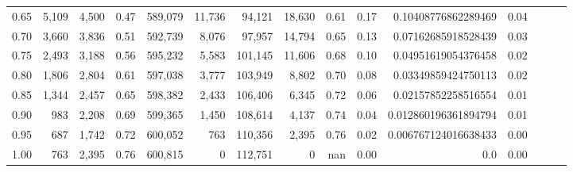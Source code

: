 \begin{tabular}{rrrrrrrrrrrrrrr}
0.65 &    5,109 &  4,500 &  0.47 &  589,079 &   11,736 &   94,121 &   18,630 &  0.61 &  0.17 &   0.10408776862289469 &      0.04 \\
0.70 &    3,660 &  3,836 &  0.51 &  592,739 &    8,076 &   97,957 &   14,794 &  0.65 &  0.13 &   0.07162685918528439 &      0.03 \\
0.75 &    2,493 &  3,188 &  0.56 &  595,232 &    5,583 &  101,145 &   11,606 &  0.68 &  0.10 &   0.04951619054376458 &      0.02 \\
0.80 &    1,806 &  2,804 &  0.61 &  597,038 &    3,777 &  103,949 &    8,802 &  0.70 &  0.08 &   0.03349859424750113 &      0.02 \\
0.85 &    1,344 &  2,457 &  0.65 &  598,382 &    2,433 &  106,406 &    6,345 &  0.72 &  0.06 &   0.02157852258516554 &      0.01 \\
0.90 &      983 &  2,208 &  0.69 &  599,365 &    1,450 &  108,614 &    4,137 &  0.74 &  0.04 &  0.012860196361894794 &      0.01 \\
0.95 &      687 &  1,742 &  0.72 &  600,052 &      763 &  110,356 &    2,395 &  0.76 &  0.02 &  0.006767124016638433 &      0.00 \\
1.00 &      763 &  2,395 &  0.76 &  600,815 &        0 &  112,751 &        0 &   nan &  0.00 &                   0.0 &      0.00 \\
\bottomrule
\end{tabular}
